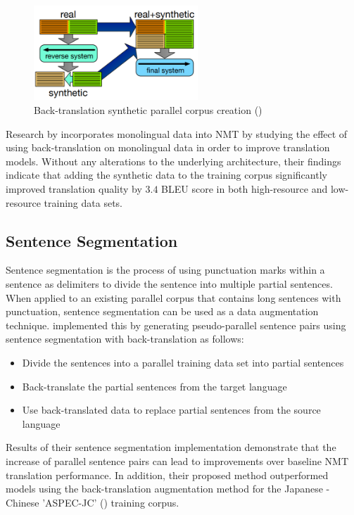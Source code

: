 \begin{figure}[ht!]
\centering
\includegraphics[width=0.55\textwidth]{media/literature/data_argumentation/da_back_trans.png}
\caption[Diagram of the back-translation synthetic parallel corpus]{Back-translation synthetic parallel corpus creation (\cite{hoang_iterative_2018})}
\label{fig:back_trans}
\end{figure}
Research by \cite{sennrich_improving_2016} incorporates monolingual data into \acrshort{NMT} by studying the effect of using back-translation on monolingual data in order to improve translation models.  Without any alterations to the underlying architecture, their findings indicate that adding the synthetic data to the training corpus significantly improved translation quality by $3.4$ BLEU score in both high-resource and low-resource training data sets.


\subsection{Sentence Segmentation}

Sentence segmentation is the process of using punctuation marks within a sentence as delimiters to divide the sentence into multiple partial sentences. When applied to an existing parallel corpus that contains long sentences with punctuation, sentence segmentation can be used as a data augmentation technique. \cite{zhang_corpus_2019} implemented this by generating pseudo-parallel sentence pairs using sentence segmentation with back-translation as follows:
\begin{itemize}
    \item Divide the sentences into a parallel training data set into partial sentences
    \item Back-translate the partial sentences from the target language
    \item Use back-translated data to replace partial sentences from the source language
\end{itemize}

Results of their sentence segmentation implementation demonstrate that the increase of parallel sentence pairs can lead to improvements over baseline \acrshort{NMT} translation performance. In addition, their proposed method outperformed models using the back-translation augmentation method for the Japanese - Chinese 'ASPEC-JC' (\cite{NAKAZAWA16.621}) training corpus.

